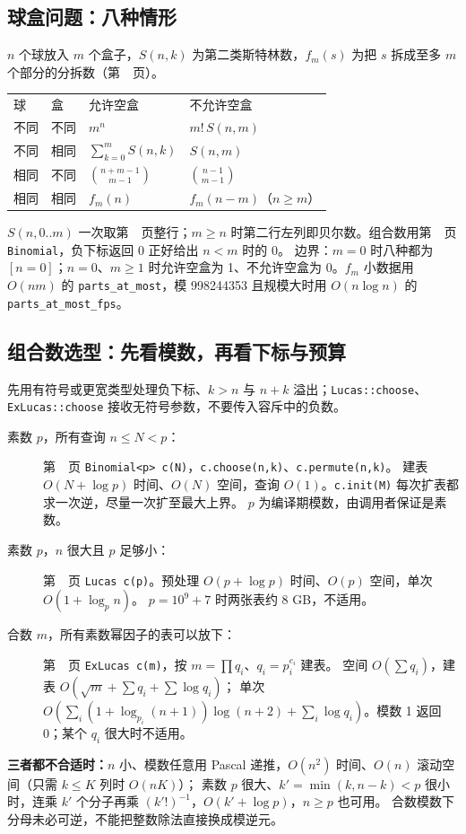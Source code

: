 \subsection{球盒问题：八种情形}\label{knowledge-ball-box}
$n$ 个球放入 $m$ 个盒子，$S(n,k)$ 为第二类斯特林数，$f_m(s)$ 为把 $s$ 拆成至多 $m$ 个部分的分拆数（第~\pageref{compact-parts_at_most}~页）。
\begin{center}
\begin{tabular}{llll}
球 & 盒 & 允许空盒 & 不允许空盒\\
不同 & 不同 & $m^n$ & $m!\,S(n,m)$\\
不同 & 相同 & $\sum_{k=0}^{m}S(n,k)$ & $S(n,m)$\\
相同 & 不同 & $\binom{n+m-1}{m-1}$ & $\binom{n-1}{m-1}$\\
相同 & 相同 & $f_m(n)$ & $f_m(n-m)$（$n\ge m$）\\
\end{tabular}
\end{center}
$S(n,0..m)$ 一次取第~\pageref{compact-stirling_second_row}~页整行；$m\ge n$ 时第二行左列即贝尔数。组合数用第~\pageref{compact-Binomial}~页 \texttt{Binomial}，负下标返回 0 正好给出 $n<m$ 时的 0。
边界：$m=0$ 时八种都为 $[n=0]$；$n=0$、$m\ge1$ 时允许空盒为 1、不允许空盒为 0。$f_m$ 小数据用 $O(nm)$ 的 \texttt{parts\_at\_most}，模 998244353 且规模大时用 $O(n\log n)$ 的 \texttt{parts\_at\_most\_fps}。


\subsection{组合数选型：先看模数，再看下标与预算}\label{knowledge-binomial-choice}
先用有符号或更宽类型处理负下标、$k>n$ 与 $n+k$ 溢出；\texttt{Lucas::choose}、\texttt{ExLucas::choose} 接收无符号参数，不要传入容斥中的负数。
\begin{description}
\item[素数 $p$，所有查询 $n\le N<p$：]
第~\pageref{compact-Binomial}~页 \texttt{Binomial<p> c(N)}，\texttt{c.choose(n,k)}、\texttt{c.permute(n,k)}。
建表 $O(N+\log p)$ 时间、$O(N)$ 空间，查询 $O(1)$。\texttt{c.init(M)} 每次扩表都求一次逆，尽量一次扩至最大上界。
$p$ 为编译期模数，由调用者保证是素数。
\item[素数 $p$，$n$ 很大且 $p$ 足够小：]
第~\pageref{compact-Lucas}~页 \texttt{Lucas c(p)}。预处理 $O(p+\log p)$ 时间、$O(p)$ 空间，单次 $O(1+\log_p n)$。
$p=10^9+7$ 时两张表约 8 GB，不适用。
\item[合数 $m$，所有素数幂因子的表可以放下：]
第~\pageref{compact-ExLucas}~页 \texttt{ExLucas c(m)}，按 $m=\prod q_i$、$q_i=p_i^{e_i}$ 建表。
空间 $O(\sum q_i)$，建表 $O(\sqrt m+\sum q_i+\sum\log q_i)$；
单次 $O(\sum_i(1+\log_{p_i}(n+1))\log(n+2)+\sum_i\log q_i)$。模数 1 返回 0；某个 $q_i$ 很大时不适用。
\end{description}
\textbf{三者都不合适时：}$n$ 小、模数任意用 Pascal 递推，$O(n^2)$ 时间、$O(n)$ 滚动空间（只需 $k\le K$ 列时 $O(nK)$）；
素数 $p$ 很大、$k'=\min(k,n-k)<p$ 很小时，连乘 $k'$ 个分子再乘 $(k'!)^{-1}$，$O(k'+\log p)$，$n\ge p$ 也可用。
合数模数下分母未必可逆，不能把整数除法直接换成模逆元。



